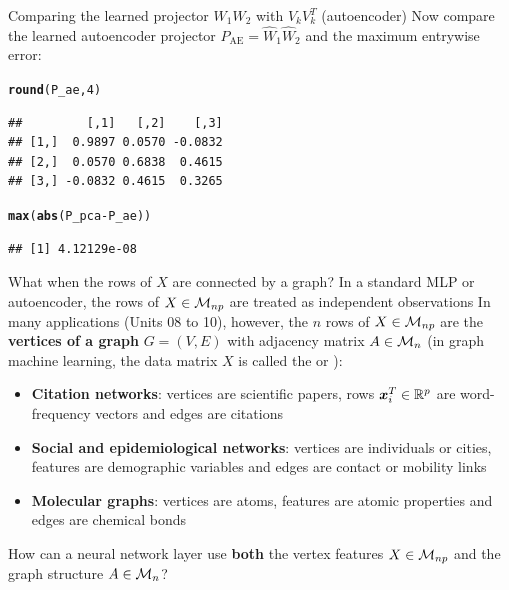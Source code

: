 \documentclass[aspectratio=169]{beamer}\usepackage[]{graphicx}\usepackage[]{xcolor}
\makeatletter
\newcommand{\hlnum}[1]{\textcolor[rgb]{0.686,0.059,0.569}{#1}}%
\newcommand{\hlopt}[1]{\textcolor[rgb]{0,0,0}{#1}}%
\newcommand{\hldef}[1]{\textcolor[rgb]{0.345,0.345,0.345}{#1}}%
\newcommand{\hlkwd}[1]{\textcolor[rgb]{0.737,0.353,0.396}{\textbf{#1}}}%
\newenvironment{kframe}{%
 \def\at@end@of@kframe{}%
 \ifinner\ifhmode%
  \def\at@end@of@kframe{\end{minipage}}%
  \begin{minipage}{\columnwidth}%
 \fi\fi%
 \def\FrameCommand##1{\hskip\@totalleftmargin \hskip-\fboxsep
 \colorbox{shadecolor}{##1}\hskip-\fboxsep
     \hskip-\linewidth \hskip-\@totalleftmargin \hskip\columnwidth}%
 \MakeFramed {\advance\hsize-\width
   \@totalleftmargin\z@ \linewidth\hsize
   \@setminipage}}%
 {\par\unskip\endMakeFramed%
 \at@end@of@kframe}
\newenvironment{knitrout}{}{} %
\makeatother
\begin{document}
\begin{frame}[fragile]{Comparing the learned projector $W_1 W_2$ with $V_k V_k^T$ (autoencoder)}
Now compare the learned autoencoder projector $P_{\text{AE}} = \hat{W}_1 \hat{W}_2$ and the maximum entrywise error:
\begin{knitrout}
\color{fgcolor}\begin{kframe}
\begin{alltt}
\hlkwd{round}\hldef{(P_ae,} \hlnum{4}\hldef{)}
\end{alltt}
\begin{verbatim}
##         [,1]   [,2]    [,3]
## [1,]  0.9897 0.0570 -0.0832
## [2,]  0.0570 0.6838  0.4615
## [3,] -0.0832 0.4615  0.3265
\end{verbatim}
\begin{alltt}
\hlkwd{max}\hldef{(}\hlkwd{abs}\hldef{(P_pca} \hlopt{-} \hldef{P_ae))}
\end{alltt}
\begin{verbatim}
## [1] 4.12129e-08
\end{verbatim}
\end{kframe}
\end{knitrout}
\end{frame}








\begin{frame}{What when the rows of $X$ are connected by a graph?}
In a standard MLP or autoencoder, the rows of $X \in \mathcal{M}_{np}$ are treated as independent observations
\vfill
In many applications (Units 08 to 10), however, the $n$ rows of $X \in \mathcal{M}_{np}$ are the \textbf{vertices of a graph} $G = (V, E)$ with adjacency matrix $A \in \mathcal{M}_n$ (in graph machine learning, the data matrix $X$ is called the  or ):
\begin{itemize}
\item \textbf{Citation networks}: vertices are scientific papers, rows $\bm{x}_i^T \in \mathbb{R}^p$ are word-frequency vectors and edges are citations
\item \textbf{Social and epidemiological networks}: vertices are individuals or cities, features are demographic variables and edges are contact or mobility links
\item \textbf{Molecular graphs}: vertices are atoms, features are atomic properties and edges are chemical bonds
\end{itemize}
\vfill
How can a neural network layer use \textbf{both} the vertex features $X \in \mathcal{M}_{np}$ and the graph structure $A \in \mathcal{M}_n$?
\end{frame}
\end{document}
